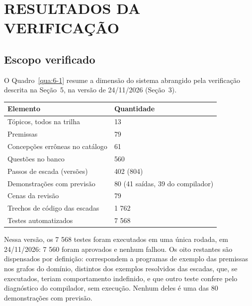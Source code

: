 
\chapter{\texorpdfstring{\mbox{RESULTADOS} \mbox{DA} \mbox{VERIFICAÇÃO}}{RESULTADOS DA VERIFICAÇÃO}}\label{cap:6}

\section{Escopo verificado}

O Quadro~\ref{qua:6-1} resume a dimensão do sistema abrangido pela verificação descrita na Seção~5, na versão de 24/11/2026 (Seção~3).

\begin{quadro}[htbp]
\caption{Dimensão do sistema verificado}\label{qua:6-1}
\footnotesize
\begin{tabularx}{\textwidth}{|X|X|}
\hline
\textbf{Elemento} & \textbf{Quantidade} \\ \hline
Tópicos, todos na trilha & 13 \\ \hline
Premissas & 79 \\ \hline
Concepções errôneas no catálogo & 61 \\ \hline
Questões no banco & 560 \\ \hline
Passos de escada (versões) & 402 (804) \\ \hline
Demonstrações com previsão & 80 (41 saídas, 39 do compilador) \\ \hline
Cenas da revisão & 79 \\ \hline
Trechos de código das escadas & 1 762 \\ \hline
Testes automatizados & 7 568 \\ \hline
\end{tabularx}
\end{quadro}

Nessa versão, os 7 568 testes foram executados em uma única rodada, em 24/11/2026: 7 560 foram aprovados e nenhum falhou. Os oito restantes são dispensados por definição: correspondem a programas de exemplo das premissas nos grafos do domínio, distintos dos exemplos resolvidos das escadas, que, se executados, teriam comportamento indefinido, e que outro teste confere pelo diagnóstico do compilador, sem execução. Nenhum deles é uma das 80 demonstrações com previsão.

